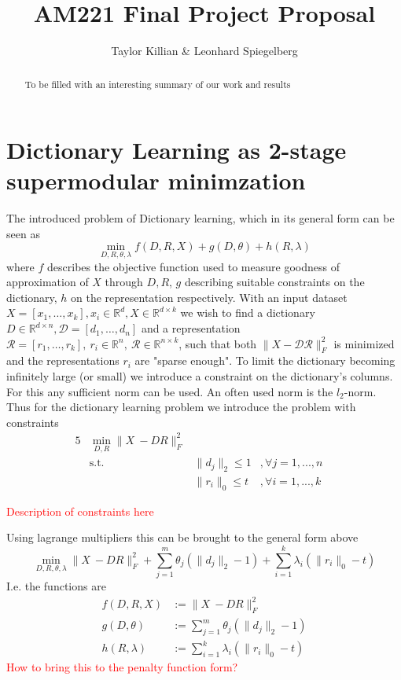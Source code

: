 \documentclass{article}
\newcommand{\R}{\mathbb{R}}
\begin{document}
\title{AM221 Final Project Proposal}
\author{Taylor Killian \& Leonhard Spiegelberg}
\maketitle

\begin{abstract}
To be filled with an interesting summary of our work and results

\end{abstract}


\section{Dictionary Learning as 2-stage supermodular minimzation}
The introduced problem of Dictionary learning, which in its general form can be seen as
\[
\min_{D, R, \theta, \lambda} f(D, R, X) + g(D, \theta) + h(R, \lambda)
\]
where $f$ describes the objective function used to measure goodness of approximation of $X$ through $D, R$, $g$ describing suitable constraints on the dictionary, $h$ on the representation respectively.
With an input dataset $X=[x_1, \dots, x_k],  x_i \in \R^d,  X \in \R^{d\times k}$ we wish to find a dictionary $D \in \R^{d\times n},  \mathcal{D} = [d_1, \dots, d_n]$ and a representation $\mathcal{R}=[r_1,\dots,r_k], \ r_i\in\R^n, \ \mathcal{R}\in\R^{n\times k}$, such that both $\|X-\mathcal{D}\mathcal{R}\|_F^2$ is minimized and the representations $r_i$ are "sparse enough". To limit the dictionary becoming infinitely large (or small) we introduce a constraint on the dictionary's columns. For this any sufficient norm can be used. An often used norm is the $l_2$-norm. 
Thus for the dictionary learning problem we introduce the problem with constraints
\begin{alignat}{5}
         &\min_{D, R} \|X \ -D R\|_F^2  & \quad   \\
         &\text{s.t.}  \quad  &\|d_j\|_2 \leq 1&, \forall j=1, ...,n  \quad \\
         &  \quad  &\|r_i\|_0 \leq t&, \forall i=1, ...,k  \quad 
\end{alignat}

\textcolor{red}{Description of constraints here}


Using lagrange multipliers this can be brought to the general form above
\[
\min_{D, R, \theta, \lambda} \|X \ -D R\|_F^2 + \sum_{j=1}^m \theta_j (\| d_j\|_2 - 1)+ \sum_{i=1}^k \lambda_i (\| r_i \|_0 - t)
\]
I.e. the functions are
\[
\begin{split}
f(D, R, X) &:= \|X \ -D R\|_F^2 \\
g(D, \theta) &:= \sum_{j=1}^m \theta_j (\| d_j\|_2 - 1) \\
h(R, \lambda) &:= \sum_{i=1}^k \lambda_i (\| r_i \|_0 - t)
\end{split}
\]
\textcolor{red}{How to bring this to the penalty function form?}
\end{document}
